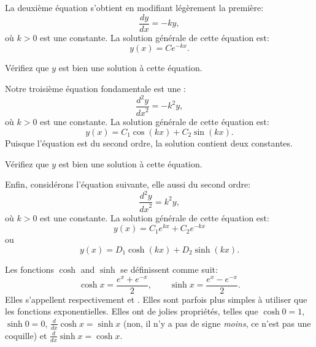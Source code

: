 La deuxième équation s'obtient en modifiant légèrement
 la première: 
\begin{equation*}
	\frac{dy}{dx} = -k y,
\end{equation*}
où $k > 0$ est une constante.
La solution générale de cette équation est: 
\begin{equation*}
	y(x) = C e^{-kx} .
\end{equation*}

\begin{exercise}
Vérifiez que $y$ est bien une solution à cette équation.
\end{exercise}

Notre troisième équation fondamentale est une 
\emph{}: 
\begin{equation*}
\frac{d^2y}{{dx}^2} = -k^2 y, 
\end{equation*}
où $k > 0$ est une constante.
La solution générale de cette équation est: 
\begin{equation*}
y(x) = C_1 \cos(kx) + C_2 \sin(kx) .
\end{equation*}
Puisque l'équation est du second ordre, la solution contient deux constantes.

\begin{exercise}
	Vérifiez que $y$ est bien une solution à cette équation.
\end{exercise}

Enfin, considérons l'équation suivante, elle aussi du second ordre: 
\begin{equation*}
	\frac{d^2y}{{dx}^2} = k^2 y ,
\end{equation*}
où $k > 0$ est une constante.
La solution générale de cette équation est: 
\begin{equation*}
	y(x) = C_1 e^{kx} + C_2 e^{-kx} 
\end{equation*}
ou
\begin{equation*}
	y(x) = D_1 \cosh(kx) + D_2 \sinh(kx) .
\end{equation*}

Les fonctions $\cosh$ and $\sinh$ se définissent comme suit:
\begin{equation*}
	\cosh x = \frac{e^{x} + e^{-x}}{2} , \qquad
	\sinh x = \frac{e^{x} - e^{-x}}{2} .
\end{equation*}
Elles s'appellent respectivement 
\emph{}
et
\emph{}.
Elles sont parfois plus simples à utiliser que les fonctions exponentielles.  Elles ont de jolies propriétés, telles que
$\cosh 0 = 1$, $\sinh 0 = 0$, $\frac{d}{dx} \cosh x = \sinh x$ (non, il n'y a pas de signe \emph{moins}, ce n'est pas une coquille)
et $\frac{d}{dx} \sinh x = \cosh x$.

